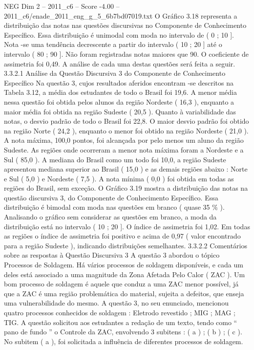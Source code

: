 \begin{textsample}{NEG Dim 2 – 2011\_c6 – Score -4.00 – 2011\_c6/enade\_2011\_eng\_g\_5\_6b7bd07019.txt}
O Gráfico 3.18 representa a distribuição das notas nas questões discursivas no Componente de Conhecimento Específico.
Essa distribuição é unimodal com moda no intervalo de ( 0 ; 10 ].
Nota -se uma tendência decrescente a partir do intervalo ( 10 ; 20 ] até o intervalo ( 80 ; 90 ].
Não foram registradas notas maiores que 90.
O coeficiente de assimetria foi 0,49.
A análise de cada uma destas questões será feita a seguir. 3.3.2.1 Análise da Questão Discursiva 3 do Componente de Conhecimento Específico Na questão 3, cujos resultados aferidos encontram -se descritos na Tabela 3.12, a média dos estudantes de todo o Brasil foi 19,6.
A menor média nessa questão foi obtida pelos alunos da região Nordeste ( 16,3 ), enquanto a maior média foi obtida na região Sudeste ( 20,5 ).
Quanto à variabilidade das notas, o desvio padrão de todo o Brasil foi 22,8.
O maior desvio padrão foi obtido na região Norte ( 24,2 ), enquanto o menor foi obtido na região Nordeste ( 21,0 ).
A nota máxima, 100,0 pontos, foi alcançada por pelo menos um aluno da região Sudeste.
As regiões onde ocorreram a menor nota máxima foram a Nordeste e a Sul ( 85,0 ).
A mediana do Brasil como um todo foi 10,0, a região Sudeste apresentou mediana superior ao Brasil ( 15,0 ) e as demais regiões abaixo : Norte e Sul ( 5,0 ) e Nordeste ( 7,5 ).
A nota mínima ( 0,0 ) foi obtida em todas as regiões do Brasil, sem exceção.
O Gráfico 3.19 mostra a distribuição das notas na questão discursiva 3, do Componente de Conhecimento Específico.
Essa distribuição é bimodal com moda nas questões em branco ( quase 35 \% ).
Analisando o gráfico sem considerar as questões em branco, a moda da distribuição está no intervalo ( 10 ; 20 ].
O índice de assimetria foi 1,02.
Em todas as regiões o índice de assimetria foi positivo e acima de 0,97 ( valor encontrado para a região Sudeste ), indicando distribuições semelhantes. 3.3.2.2 Comentários sobre as respostas à Questão Discursiva 3 A questão 3 abordou o tópico Processos de Soldagem.
Há vários processos de soldagem disponíveis, e cada um deles está associado a uma magnitude da Zona Afetada Pelo Calor ( ZAC ).
Um bom processo de soldagem é aquele que conduz a uma ZAC menor possível, já que a ZAC é uma região problemática do material, sujeita a defeitos, que enseja uma vulnerabilidade do mesmo.
A questão 3, no seu enunciado, mencionou quatro processos conhecidos de soldagem : Eletrodo revestido ; MIG ; MAG ; TIG.
A questão solicitou aos estudantes a redação de um texto, tendo como “ pano de fundo ” o Controle da ZAC, envolvendo 3 subitens : ( a ) ; ( b ) ; ( c ).
No subitem ( a ), foi solicitada a influência de diferentes processos de soldagem.

\end{textsample}
